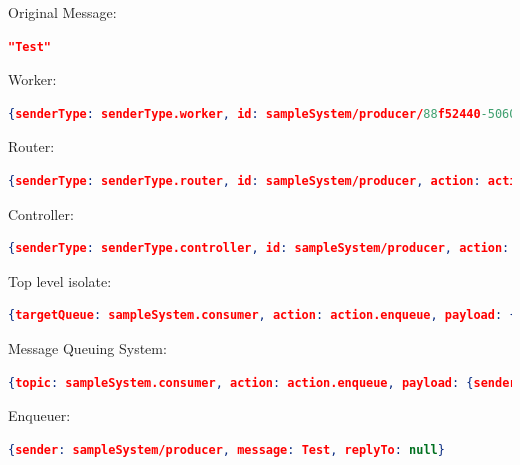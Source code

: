 \begin{description}

\item Original Message:
\begin{lstlisting}[language=json,numbers=none]
"Test"
\end{lstlisting}

\item Worker:
\begin{lstlisting}[language=json,numbers=none]
{senderType: senderType.worker, id: sampleSystem/producer/88f52440-5060-11e4-f396-97cebb949945, action: action.send, payload: {sender: sampleSystem/producer, to: sampleSystem/consumer, message: Test, replyTo: null}}
\end{lstlisting}

\item Router:
\begin{lstlisting}[language=json,numbers=none]
{senderType: senderType.router, id: sampleSystem/producer, action: action.send, payload: {sender: sampleSystem/producer, to: sampleSystem/consumer, message: Test, replyTo: null\}\}
\end{lstlisting}

\item Controller:
\begin{lstlisting}[language=json,numbers=none]
{senderType: senderType.controller, id: sampleSystem/producer, action: action.send, payload: {sender: sampleSystem/producer, to: sampleSystem/consumer, message: Test, replyTo: null\}\}
\end{lstlisting}

\item Top level isolate:
\begin{lstlisting}[language=json,numbers=none]
{targetQueue: sampleSystem.consumer, action: action.enqueue, payload: {sender: sampleSystem/producer, message: Test, replyTo: null}}
\end{lstlisting}

\item Message Queuing System:
\begin{lstlisting}[language=json,numbers=none]
{topic: sampleSystem.consumer, action: action.enqueue, payload: {sender: sampleSystem/producer, message: Test, replyTo: null}}
\end{lstlisting}

\item Enqueuer:
\begin{lstlisting}[language=json,numbers=none]
  {sender: sampleSystem/producer, message: Test, replyTo: null}
\end{lstlisting}
\end{description}

